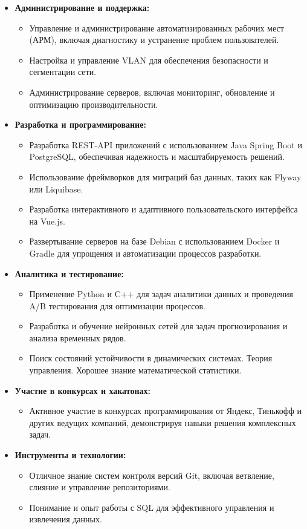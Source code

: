 \documentclass[a4paper,10pt]{article}
\begin{document}
\begin{itemize}
    \item \textbf{Администрирование и поддержка:}
    \begin{itemize}
        \item Управление и администрирование автоматизированных рабочих мест (АРМ), включая диагностику и устранение проблем пользователей.
        \item Настройка и управление VLAN для обеспечения безопасности и сегментации сети.
        \item Администрирование серверов, включая мониторинг, обновление и оптимизацию производительности.
    \end{itemize}

    \item \textbf{Разработка и программирование:}
    \begin{itemize}
        \item Разработка REST-API приложений с использованием Java Spring Boot и PostgreSQL, обеспечивая надежность и масштабируемость решений.
        \item Использование фреймворков для миграций баз данных, таких как Flyway или Liquibase.
        \item Разработка интерактивного и адаптивного пользовательского интерфейса на Vue.js.
        \item Развертывание серверов на базе Debian с использованием Docker и Gradle для упрощения и автоматизации процессов разработки.
    \end{itemize}

    \item \textbf{Аналитика и тестирование:}
    \begin{itemize}
        \item Применение Python и C++ для задач аналитики данных и проведения A/B тестирования для оптимизации процессов.
        \item Разработка и обучение нейронных сетей для задач прогнозирования и анализа временных рядов.
        \item Поиск состояний устойчивости в динамических системах. Теория управления. Хорошее знание математической статистики. 
    \end{itemize}

    \item \textbf{Участие в конкурсах и хакатонах:}
    \begin{itemize}
        \item Активное участие в конкурсах программирования от Яндекс, Тинькофф и других ведущих компаний, демонстрируя навыки решения комплексных задач.
    \end{itemize}

    \item \textbf{Инструменты и технологии:}
    \begin{itemize}
        \item Отличное знание систем контроля версий Git, включая ветвление, слияние и управление репозиториями.
        \item Понимание и опыт работы с SQL для эффективного управления и извлечения данных.
    \end{itemize}
\end{itemize}
\end{document}

